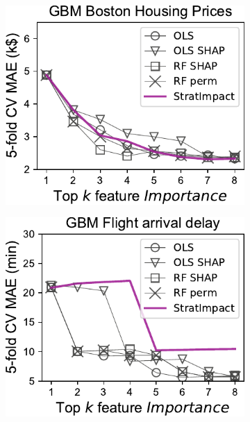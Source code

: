 \documentclass[11pt]{article}
\begin{document}
\begin{figure}
\centering
\begin{subfigure}{.245\textwidth}
    \centering
\includegraphics[scale=0.45]{images/boston-topk-GBM-Importance.pdf}
\subcaption{}
\end{subfigure}%
\hfill
\begin{subfigure}{.245\textwidth}
    \centering
\includegraphics[scale=0.45]{images/flights-topk-GBM-Importance.pdf}
\subcaption{}
\end{subfigure}
\hfill
\begin{subfigure}{.245\textwidth}
    \centering

\end{subfigure}
\end{figure}
\end{document}
